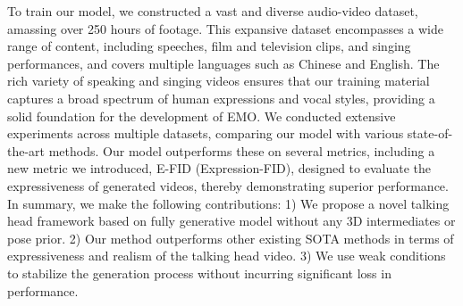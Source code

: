 \documentclass[runningheads]{llncs}
\begin{document}
To train our model, we constructed a vast and diverse audio-video dataset, amassing over 250 hours of footage. This expansive dataset encompasses a wide range of content, including speeches, film and television clips, and singing performances, and covers multiple languages such as Chinese and English. The rich variety of speaking and singing videos ensures that our training material captures a broad spectrum of human expressions and vocal styles, providing a solid foundation for the development of EMO. 
We conducted extensive experiments across multiple datasets, comparing our model with various state-of-the-art methods. Our model outperforms these on several metrics, including a new metric we introduced, E-FID (Expression-FID), designed to evaluate the expressiveness of generated videos, thereby demonstrating superior performance.
In summary, we make the following contributions: 1) We propose a novel talking head framework based on fully generative model without any 3D intermediates or pose prior. 2) Our method outperforms other existing SOTA methods in terms of expressiveness and realism of the talking head video. 3) We use weak conditions to stabilize the generation process without incurring significant loss in performance.
\end{document}
